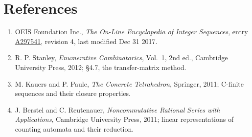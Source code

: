\documentclass[11pt]{article}
\theoremstyle{definition}
\begin{document}
\section{References}

\begin{enumerate}

\item OEIS Foundation Inc., \emph{The On-Line Encyclopedia of Integer Sequences}, entry \href{https://oeis.org/A297541}{A297541}, revision 4, last modified Dec 31 2017.

\item R. P. Stanley, \emph{Enumerative Combinatorics}, Vol.~1, 2nd ed., Cambridge University Press, 2012; \S4.7, the transfer-matrix method.

\item M. Kauers and P. Paule, \emph{The Concrete Tetrahedron}, Springer, 2011; C-finite sequences and their closure properties.

\item J. Berstel and C. Reutenauer, \emph{Noncommutative Rational Series with Applications}, Cambridge University Press, 2011; linear representations of counting automata and their reduction.

\end{enumerate}
\end{document}
